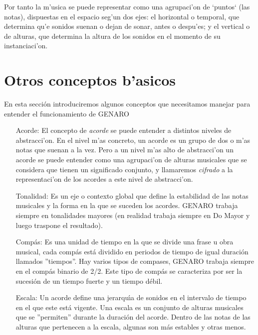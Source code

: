 ﻿\documentclass[a4paper,12pt]{article}
\begin{document}
Por tanto la m'usica se puede representar como una agrupaci'on de `puntos` (las notas), dispuestas en el espacio seg'un dos ejes: el horizontal o temporal, que determina qu'e sonidos suenan o dejan de sonar, antes o despu'es; y el vertical o de alturas, que determina la altura de los sonidos en el momento de su instanciaci'on.

\section{Otros conceptos b'asicos}
En esta secci\'on introduciremos algunos conceptos que necesitamos manejar para entender el funcionamiento de GENARO

\begin{itemize}

\item [Acorde:] El concepto de \emph{acorde} se puede entender a distintos niveles de abstracci'on. En el nivel m'as concreto, un acorde es un grupo de dos o m'as notas que suenan a la vez. Pero a un nivel m'as alto de abstracci'on un acorde se puede entender como una agrupaci'on de alturas musicales que se considera que tienen un significado conjunto, y llamaremos \emph{cifrado} a la representaci'on de los acordes a este nivel de abstracci'on. 

\item [Tonalidad:] Es un eje o contexto global que define la estabilidad de las notas musicales y la forma en la que se suceden los acordes. GENARO trabaja siempre en tonalidades mayores (en realidad trabaja siempre en Do Mayor y luego traspone el resultado).
 
\item [Comp\'as:] Es una unidad de tiempo en la que se divide una frase u obra musical, cada comp\'as est\'a dividido en periodos de tiempo de igual duraci\'on llamados ''tiempos''. Hay varios tipos de compases, GENARO trabaja siempre en el comp\'as binario de 2/2. Este tipo de comp\'as se caracteriza por ser la sucesi\'on de un tiempo fuerte y un tiempo d\'ebil.

\item [Escala:] Un acorde define una jerarqu\'\i a de sonidos en el intervalo de tiempo en el que este est\'a vigente. Una escala es un conjunto de alturas musicales que se ''permiten'' durante la duraci\'on del acorde. Dentro de las notas de las alturas que pertenecen a la escala, algunas son m\'as estables y otras menos.

\end{itemize}
\end{document}
